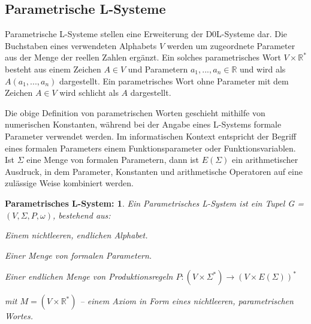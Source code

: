 \subsection{Parametrische L-Systeme}

Parametrische L-Systeme stellen eine Erweiterung der D0L-Systeme dar. Die Buchstaben eines verwendeten Alphabets $V$ werden um zugeordnete Parameter aus der Menge der reellen Zahlen ergänzt. Ein solches parametrisches Wort $V \times \mathbb{R}^*$ besteht aus einem Zeichen $A \in V$ und Parametern $a_1,...,a_n \in \mathbb{R}$ und wird als $A(a_1,...,a_n)$ dargestellt. Ein parametrisches Wort ohne Parameter mit dem Zeichen $A \in V$  wird schlicht als $A$ dargestellt. \cite[S.41]{ABOP:04}

Die obige Definition von parametrischen Worten geschieht mithilfe von numerischen Konstanten, während bei der Angabe eines L-Systems formale Parameter verwendet werden. Im informatischen Kontext entspricht der Begriff eines formalen Parameters einem Funktionsparameter oder Funktionsvariablen. \cite[S.16f]{FormalParamDef:05} Ist $\Sigma$ eine Menge von formalen Parametern, dann ist $E(\Sigma)$ ein arithmetischer Ausdruck, in dem Parameter, Konstanten und arithmetische Operatoren auf eine zulässige Weise kombiniert werden. \cite[S.41]{ABOP:04}

\newtheorem{defParametrischeLSysteme}{Parametrisches L-System:}[section]
\begin{defParametrischeLSysteme}
	Ein Parametrisches L-System ist ein Tupel G = $(V, \Sigma, P, \omega)$, bestehend aus:
	\begin{description}[labelindent]
		\item[\boldmath$V$] Einem nichtleeren, endlichen Alphabet.\\
		
		\item[\boldmath$\Sigma$] Einer Menge von formalen Parametern.\\
		
		\item[\boldmath$P$] Einer endlichen Menge von Produktionsregeln $P : (V\times \Sigma^*) \rightarrow (V\times E(\Sigma))^*$\\
		
		\item[\boldmath$\omega \in M^+$] mit $M =(V \times \mathbb{R}^*)$ -- einem Axiom in Form eines nichtleeren, parametrischen Wortes.
	\end{description}
\cite[S.41]{ABOP:04}
\end{defParametrischeLSysteme}

